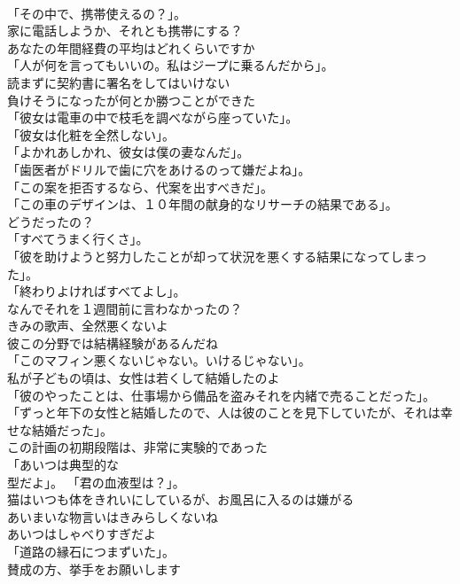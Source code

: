 \documentclass[8pt]{extreport}
\begin{document}
\begin{CJK}{UTF8}{min}
\\	「その中で、携帯使えるの？」。	
\\	家に電話しようか、それとも携帯にする？	
\\	あなたの年間経費の平均はどれくらいですか	
\\	「人が何を言ってもいいの。私はジープに乗るんだから」。	
\\	読まずに契約書に署名をしてはいけない	
\\	負けそうになったが何とか勝つことができた	
\\	「彼女は電車の中で枝毛を調べながら座っていた」。	
\\	「彼女は化粧を全然しない」。	
\\	「よかれあしかれ、彼女は僕の妻なんだ」。	
\\	「歯医者がドリルで歯に穴をあけるのって嫌だよね」。	
\\	「この案を拒否するなら、代案を出すべきだ」。	
\\	「この車のデザインは、１０年間の献身的なリサーチの結果である」。	
\\	どうだったの？	
\\	「すべてうまく行くさ」。	
\\	「彼を助けようと努力したことが却って状況を悪くする結果になってしまった」。	
\\	「終わりよければすべてよし」。	
\\	なんでそれを１週間前に言わなかったの？	
\\	きみの歌声、全然悪くないよ	
\\	彼この分野では結構経験があるんだね	
\\	「このマフィン悪くないじゃない。いけるじゃない」。	
\\	私が子どもの頃は、女性は若くして結婚したのよ	
\\	「彼のやったことは、仕事場から備品を盗みそれを内緒で売ることだった」。	
\\	「ずっと年下の女性と結婚したので、人は彼のことを見下していたが、それは幸せな結婚だった」。	
\\	この計画の初期段階は、非常に実験的であった	
\\	「あいつは典型的な
\\	型だよ」。 「君の血液型は？」。	
\\	猫はいつも体をきれいにしているが、お風呂に入るのは嫌がる	
\\	あいまいな物言いはきみらしくないね	
\\	あいつはしゃべりすぎだよ	
\\	「道路の縁石につまずいた」。	
\\	賛成の方、挙手をお願いします	

\end{CJK}
\end{document}
